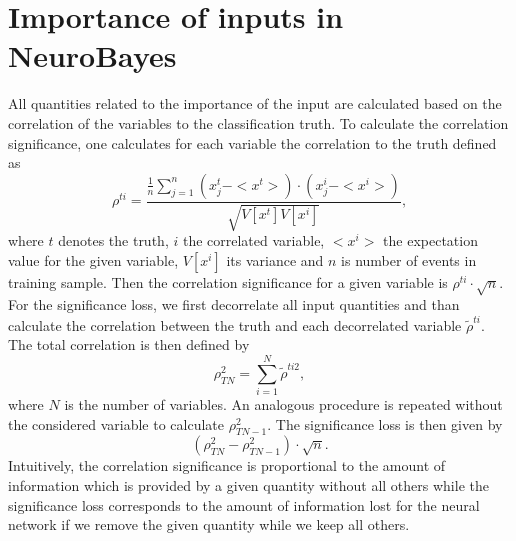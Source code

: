 \section{Importance of inputs in NeuroBayes}
\label{ap:nnImportance}

All quantities related to the importance of the input
are calculated based on the correlation of
the variables to the classification truth. To calculate
the  correlation significance,
one calculates for each variable the correlation to the truth
defined as
$$
\rho^{ti}=\frac{\frac{1}{n}\sum_{j=1}^{n}\left(x^{t}_{j}-<x^{t}>\right)\cdot\left(x^{i}_{j}-<x^i>\right)}{\sqrt{V[x^t]V[x^i]}},
$$
where $t$ denotes the truth, $i$ the correlated
variable, $<x^i>$ the expectation
value for the given variable, $V[x^i]$ its variance and $n$ is
number of events in training sample. Then the
correlation significance for a given variable is
$\rho^{ti}\cdot\sqrt{n}$. For the significance loss, we first
decorrelate all input quantities and than calculate the
correlation between the truth and each decorrelated variable
$\tilde\rho^{ti}$. The total correlation is then defined by
$$
\rho_{TN}^2=\sum_{i=1}^{N}\tilde\rho^{ti2},
$$
where $N$ is the number of variables. An analogous procedure is
repeated without the considered variable to calculate
$\rho_{TN-1}^2$. The significance loss is then given by
$$
\left(\rho_{TN}^2-\rho_{TN-1}^2\right)\cdot\sqrt{n}.
$$
Intuitively, the correlation significance is proportional to
the amount of information which is provided by a given quantity
without all others while the significance loss corresponds to
the amount of information lost for the neural network if we
remove the given quantity while we keep all others.

